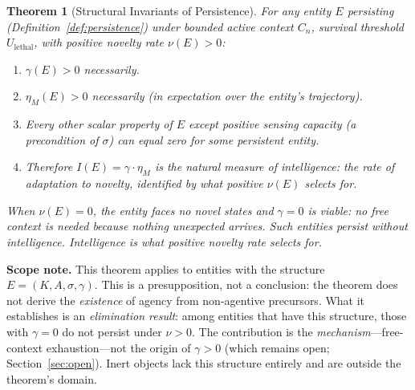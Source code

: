 \documentclass[11pt]{article}
\newtheorem{theorem}{Theorem}
\theoremstyle{definition}
\theoremstyle{remark}
\begin{document}
\begin{theorem}[Structural Invariants of Persistence]
\label{thm:invariants}
For any entity $E$ persisting (Definition~\ref{def:persistence}) under
bounded active context $C_n$, survival threshold
$U_{\mathrm{lethal}}$, with positive novelty rate $\nu(E) > 0$:
\begin{enumerate}
\item[(i)] $\gamma(E) > 0$ necessarily.
\item[(ii)] $\eta_M(E) > 0$ necessarily (in expectation over the
      entity's trajectory).
\item[(iii)] Every other scalar property of $E$ except positive
      sensing capacity (a precondition of $\sigma$) can equal zero
      for some persistent entity.
\item[(iv)] Therefore $I(E) = \gamma \cdot \eta_M$ is the natural measure
      of intelligence: the rate of adaptation to novelty, identified
      by what positive $\nu(E)$ selects for.
\end{enumerate}

When $\nu(E) = 0$, the entity faces no novel states and $\gamma = 0$ is
viable: no free context is needed because nothing unexpected arrives.
Such entities persist without intelligence. Intelligence is what positive
novelty rate selects for.
\end{theorem}

\textbf{Scope note.} This theorem applies to entities with the
structure $E = (K, A, \sigma, \gamma)$. This is a presupposition, not a
conclusion: the theorem does not derive the \emph{existence} of agency
from non-agentive precursors. What it establishes is an
\emph{elimination result}: among entities that have this structure,
those with $\gamma = 0$ do not persist under $\nu > 0$. The
contribution is the \emph{mechanism}---free-context exhaustion---not
the origin of $\gamma > 0$ (which remains open;
Section~\ref{sec:open}). Inert objects lack this structure entirely
and are outside the theorem's domain.
\end{document}
